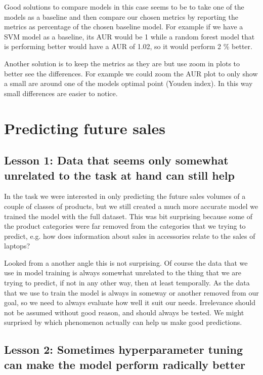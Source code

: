 \documentclass[12pt,a4paper,leqno]{report}
\theoremstyle{plain}
\theoremstyle{definition}
\theoremstyle{remark}
\begin{document}
Good solutions to compare models in this case seems to be to take one of the models as a baseline
and then compare our chosen metrics by reporting the metrics as percentage of the chosen baseline model.
For example if we have a SVM model as a baseline, its AUR would be 1 while a random forest model
that is performing better would have a AUR of 1.02, so it would perform 2 \% better.

Another solution is to keep the metrics as they are but use zoom in plots to better see the differences.
For example we could zoom the AUR plot to only show a small are around one of the models optimal point
(Youden index). In this way small differences are easier to notice.

\section{Predicting future sales}

\subsection{Lesson 1: Data that seems only somewhat unrelated to the task at hand can still help}

In the task we were interested in only predicting the future sales volumes of a couple of classes of
products, but we still created a much more accurate model we trained the model with the full dataset.
This was bit surprising because some of the product categories were far removed from the categories that
we trying to predict, e.g. how does information about sales in accessories relate to the sales
of laptops?

Looked from a another angle this is not surprising. Of course the data that we use in model
training is always somewhat unrelated to the thing that we are trying to predict, if not in any other
way, then at least temporally. As the data that we use to train the model is always in someway or another
removed from our goal, so we need to always evaluate how well it suit our needs. Irrelevance should
not be assumed without good reason, and should always be tested. We might surprised by which
phenomenon actually can help us make good predictions.

\subsection{Lesson 2: Sometimes hyperparameter tuning can make the model perform radically better}
\end{document}
